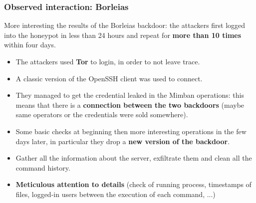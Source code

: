 \begin{frame}
	\frametitle{Observed interaction: Borleias}
	
	More interesting the results of the Borleias backdoor: the attackers first logged into the honeypot in less than 24 hours and repeat for \textbf{more than 10 times} within four days.
	
	\smallskip
	
	\begin{itemize}
	  \item The attackers used \textbf{Tor} to login, in order to not leave trace.
	  \item A classic version of the OpenSSH client was used to connect.
	  \item They managed to get the credential leaked in the Mimban operations: this means that there is a \textbf{connection between the two backdoors} (maybe same operators or the credentials were sold somewhere).
	  \item Some basic checks at beginning then more interesting operations in the few days later, in particular they drop a \textbf{new version of the backdoor}.
	  \item Gather all the information about the server, exfiltrate them and clean all the command history.
	  \item \textbf{Meticulous attention to details} (check of running process, timestamps of files, logged-in users between the execution of each command, ...)
	\end{itemize} 
	
\end{frame}
